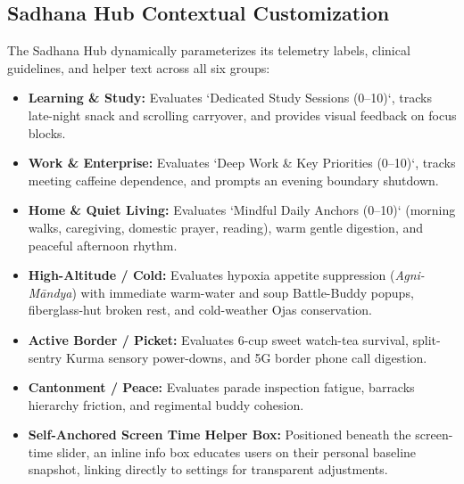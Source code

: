 \documentclass[11pt,a4paper]{article}
\begin{document}
\subsection{Sadhana Hub Contextual Customization}
The Sadhana Hub dynamically parameterizes its telemetry labels, clinical guidelines, and helper text across all six groups:
\begin{itemize}[leftmargin=*]
    \item \textbf{Learning \& Study:} Evaluates `Dedicated Study Sessions (0--10)`, tracks late-night snack and scrolling carryover, and provides visual feedback on focus blocks.
    \item \textbf{Work \& Enterprise:} Evaluates `Deep Work \& Key Priorities (0--10)`, tracks meeting caffeine dependence, and prompts an evening boundary shutdown.
    \item \textbf{Home \& Quiet Living:} Evaluates `Mindful Daily Anchors (0--10)` (morning walks, caregiving, domestic prayer, reading), warm gentle digestion, and peaceful afternoon rhythm.
    \item \textbf{High-Altitude / Cold:} Evaluates hypoxia appetite suppression (\textit{Agni-M\=andya}) with immediate warm-water and soup Battle-Buddy popups, fiberglass-hut broken rest, and cold-weather Ojas conservation.
    \item \textbf{Active Border / Picket:} Evaluates 6-cup sweet watch-tea survival, split-sentry Kurma sensory power-downs, and 5G border phone call digestion.
    \item \textbf{Cantonment / Peace:} Evaluates parade inspection fatigue, barracks hierarchy friction, and regimental buddy cohesion.
    \item \textbf{Self-Anchored Screen Time Helper Box:} Positioned beneath the screen-time slider, an inline info box educates users on their personal baseline snapshot, linking directly to settings for transparent adjustments.
\end{itemize}
\end{document}
